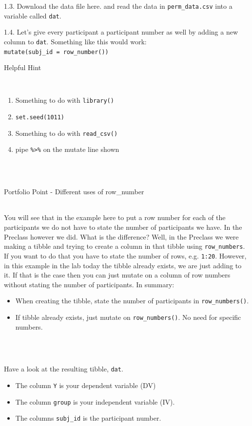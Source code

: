 \documentclass[]{book}
\providecommand{\tightlist}{%
  \setlength{\itemsep}{0pt}\setlength{\parskip}{0pt}}
\newenvironment{info}
    {
    \hline\\
    }
    { 
    \\\\\hline
    }
\begin{document}
1.3. Download the data file here. and read the data in \texttt{perm\_data.csv} into a variable called \texttt{dat}.

1.4. Let's give every participant a participant number as well by adding a new column to \texttt{dat}. Something like this would work: \texttt{mutate(subj\_id\ =\ row\_number())}

Helpful Hint

\begin{info}
\begin{enumerate}
.{enumi{enumi}.}
\item
  Something to do with \texttt{library()}
\item
  \texttt{set.seed(1011)}
\item
  Something to do with \texttt{read\_csv()}
\item
  pipe \texttt{\%\textgreater{}\%} on the mutate line shown
\end{enumerate}
\end{info}

Portfolio Point - Different uses of row\_number

\begin{info}
You will see that in the example here to put a row number for each of
the participants we do not have to state the number of participants we
have. In the Preclass however we did. What is the difference? Well, in
the Preclass we were making a tibble and trying to create a column in
that tibble using \texttt{row\_numbers}. If you want to do that you have
to state the number of rows, e.g. \texttt{1:20}. However, in this
example in the lab today the tibble already exists, we are just adding
to it. If that is the case then you can just mutate on a column of row
numbers without stating the number of participants. In summary:

\begin{itemize}
\tightlist
\item
  When creating the tibble, state the number of participants in
  \texttt{row\_numbers()}.
\item
  If tibble already exists, just mutate on \texttt{row\_numbers()}. No
  need for specific numbers.
\end{itemize}
\end{info}

Have a look at the resulting tibble, \texttt{dat}.

\begin{itemize}
\tightlist
\item
  The column \texttt{Y} is your dependent variable (DV)
\item
  The column \texttt{group} is your independent variable (IV).
\item
  The columns \texttt{subj\_id} is the participant number.
\end{itemize}
\end{document}
